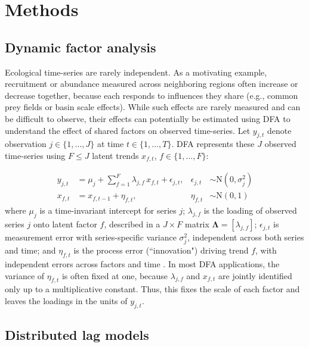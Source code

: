\documentclass[12pt]{article}
\begin{document}
\section{Methods}
\label{sec:methods}

\subsection{Dynamic factor analysis}

Ecological time-series are rarely independent. As a motivating example,
recruitment or abundance measured across neighboring regions often
increase or decrease together, because each responds to influences they
share (e.g., common prey fields or basin scale effects). While such
effects are rarely measured and can be difficult to observe, their
effects can potentially be estimated using DFA to understand the effect
of shared factors on observed time-series. Let $y_{j,t}$ denote
observation $j \in \{1,\dots,J\}$ at time $t \in \{1,\dots,T\}$. DFA
represents these $J$ observed time-series using $F \le J$ latent trends
$x_{f,t}$, $f \in \{1,\dots,F\}$:

\begin{align}
  y_{j,t} &= \mu_j + \sum_{f=1}^{F} \lambda_{j,f}\, x_{f,t}
             + \epsilon_{j,t},
  &\epsilon_{j,t} &\sim \mathrm{N}\!\left(0, \sigma_j^2\right)
  \label{eq:dfa-obs} \\
  x_{f,t} &= x_{f,t-1} + \eta_{f,t},
  &\eta_{f,t} &\sim \mathrm{N}\!\left(0, 1\right)
  \label{eq:dfa-trend}
\end{align}
where $\mu_j$ is a time-invariant intercept for series $j$;
$\lambda_{j,f}$ is the loading of observed series $j$ onto latent factor
$f$, described in a $J \times F$ matrix $\boldsymbol\Lambda =
[\lambda_{j,f}]$; $\epsilon_{j,t}$ is measurement error with
series-specific variance $\sigma_j^2$, independent across both series
and time; and $\eta_{f,t}$ is the process error (``innovation") driving
trend $f$, with independent errors across factors and time
\citep{zuur_estimating_2003,zuur_dynamic_2003}. In most DFA
applications, the variance of $\eta_{f,t}$ is often fixed at one,
because $\lambda_{j,f}$ and $x_{f,t}$ are jointly identified only up to
a multiplicative constant. Thus, this fixes the scale of each factor and
leaves the loadings in the units of $y_{j,t}$.

\subsection{Distributed lag models}
\end{document}
